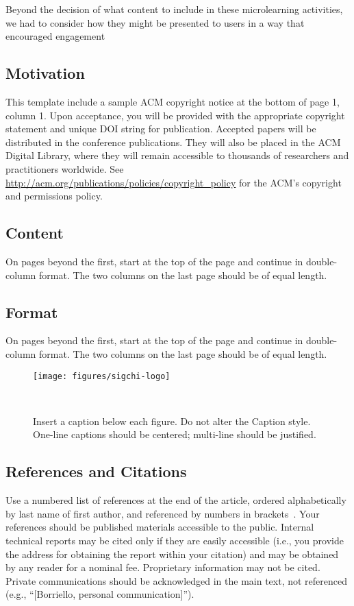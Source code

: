 \documentclass{sigchi}
\begin{document}
Beyond the decision of what content to include in these microlearning
activities, we had to consider how they might be presented to users in 
a way that encouraged engagement

\subsection{Motivation}
This template include a sample ACM copyright notice at the bottom of
page 1, column 1.  Upon acceptance, you will be provided with the
appropriate copyright statement and unique DOI string for publication.
Accepted papers will be distributed in the conference
publications. They will also be placed in the ACM Digital Library,
where they will remain accessible to thousands of researchers and
practitioners worldwide. See
\url{http://acm.org/publications/policies/copyright_policy} for the
ACM's copyright and permissions policy.

\subsection{Content}

On pages beyond the first, start at the top of the page and continue
in double-column format.  The two columns on the last page should be
of equal length.

\subsection{Format}

On pages beyond the first, start at the top of the page and continue
in double-column format.  The two columns on the last page should be
of equal length.

\begin{figure}
\centering
  \texttt{[image: figures/sigchi-logo]}
  \caption{Insert a caption below each figure. Do not alter the
    Caption style.  One-line captions should be centered; multi-line
    should be justified. }~\label{fig:figure1}
\end{figure}

\subsection{References and Citations}

Use a numbered list of references at the end of the article, ordered
alphabetically by last name of first author, and referenced by numbers
in
brackets~\cite{acm_categories,ethics,Klemmer:2002:WSC:503376.503378}.
Your references should be published materials accessible to the
public. Internal technical reports may be cited only if they are
easily accessible (i.e., you provide the address for obtaining the
report within your citation) and may be obtained by any reader for a
nominal fee. Proprietary information may not be cited. Private
communications should be acknowledged in the main text, not referenced
(e.g., ``[Borriello, personal communication]'').
\end{document}
